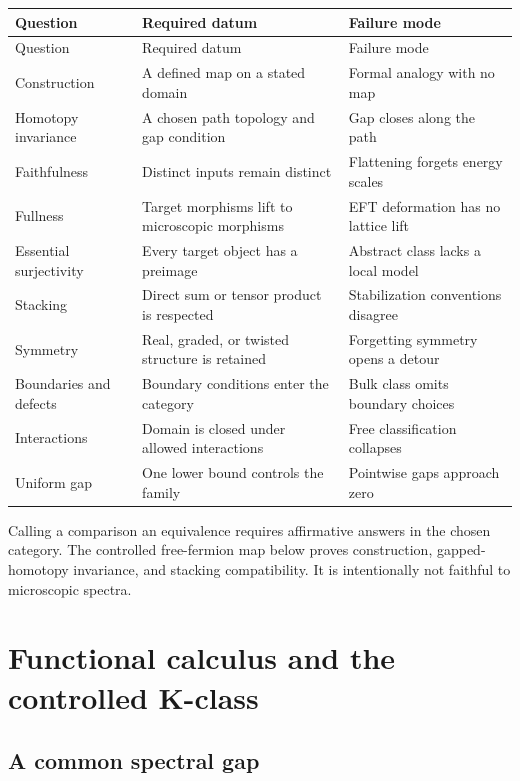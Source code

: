 \documentclass[12pt]{article}
\theoremstyle{definition}
\theoremstyle{remark}
\begin{document}
\begin{longtable}{p{}p{}p{}}
\toprule
Question & Required datum & Failure mode \\
\midrule
\endfirsthead
\toprule
Question & Required datum & Failure mode \\
\midrule
\endhead
Construction & A defined map on a stated domain & Formal analogy with no map \\
Homotopy invariance & A chosen path topology and gap condition & Gap closes along the path \\
Faithfulness & Distinct inputs remain distinct & Flattening forgets energy scales \\
Fullness & Target morphisms lift to microscopic morphisms & EFT deformation has no lattice lift \\
Essential surjectivity & Every target object has a preimage & Abstract class lacks a local model \\
Stacking & Direct sum or tensor product is respected & Stabilization conventions disagree \\
Symmetry & Real, graded, or twisted structure is retained & Forgetting symmetry opens a detour \\
Boundaries and defects & Boundary conditions enter the category & Bulk class omits boundary choices \\
Interactions & Domain is closed under allowed interactions & Free classification collapses \\
Uniform gap & One lower bound controls the family & Pointwise gaps approach zero \\
\bottomrule
\end{longtable}

Calling a comparison an equivalence requires affirmative answers in the
chosen category.
The controlled free-fermion map below proves construction, gapped-homotopy
invariance, and stacking compatibility.
It is intentionally not faithful to microscopic spectra.

\section{Functional calculus and the controlled K-class}
\label{sec:functional-calculus}

\subsection{A common spectral gap}
\end{document}
